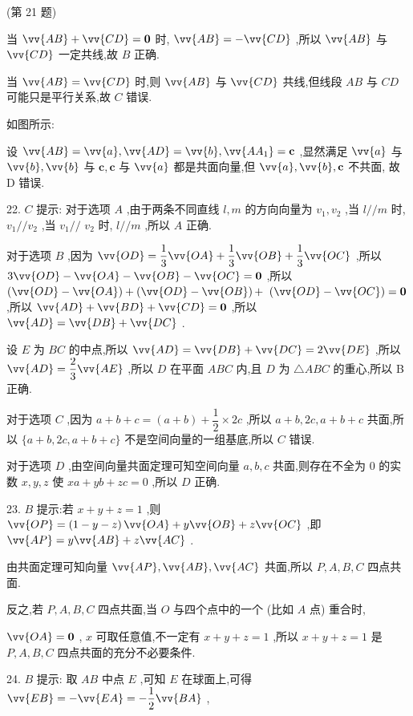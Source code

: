 (第 21 题)

当 $\vv{AB} + \vv{CD} = \mathbf{0}$ 时, $\vv{AB} =  - \vv{CD}$ ,所以 $\vv{AB}$ 与 $\vv{CD}$ 一定共线,故 $B$ 正确.

当 $\vv{AB} = \vv{CD}$ 时,则 $\vv{AB}$ 与 $\vv{CD}$ 共线,但线段 ${AB}$ 与 ${CD}$ 可能只是平行关系,故 $C$ 错误.

如图所示:

设 $\vv{AB} = \vv{a},\vv{AD} = \vv{b},\vv{A{A}_{1}} = \mathbf{c}$ ,显然满足 $\vv{a}$ 与 $\vv{b},\vv{b}$ 与 $\mathbf{c},\mathbf{c}$ 与 $\vv{a}$ 都是共面向量,但 $\vv{a},\vv{b},\mathbf{c}$ 不共面, 故 D 错误.

22. $C$ 提示: 对于选项 $A$ ,由于两条不同直线 $l,m$ 的方向向量为 ${v}_{1},{v}_{2}$ ,当 $l//m$ 时, ${v}_{1}//{v}_{2}$ ,当 ${v}_{1}//$  ${v}_{2}$ 时, $l//m$ ,所以 $A$ 正确.

对于选项 $B$ ,因为 $\vv{OD} = \dfrac{1}{3}\vv{OA} + \dfrac{1}{3}\vv{OB} + \dfrac{1}{3}\vv{OC}$ ,所以 $3\vv{OD} - \vv{OA} - \vv{OB} - \vv{OC} = \mathbf{0}$ ,所以 $\left( {\vv{OD} - \vv{OA}}\right)  + \left( {\vv{OD} - \vv{OB}}\right)  +$  $\left( {\vv{OD} - \vv{OC}}\right)  = \mathbf{0}$ ,所以 $\vv{AD} + \vv{BD} + \vv{CD} = \mathbf{0}$ ,所以 $\vv{AD} = \vv{DB} + \vv{DC}$ .

设 $E$ 为 ${BC}$ 的中点,所以 $\vv{AD} = \vv{DB} + \vv{DC} = 2\vv{DE}$ ,所以 $\vv{AD} = \dfrac{2}{3}\vv{AE}$ ,所以 $D$ 在平面 ${ABC}$ 内,且 $D$ 为 $\bigtriangleup  {ABC}$ 的重心,所以 B 正确.

对于选项 $C$ ,因为 $a + b + c = \left( {a + b}\right)  + \dfrac{1}{2} \times  {2c}$ ,所以 $a + b,{2c},a + b + c$ 共面,所以 $\{ a + b,{2c},a + b + c\}$ 不是空间向量的一组基底,所以 $C$ 错误.

对于选项 $D$ ,由空间向量共面定理可知空间向量 $a,b,c$ 共面,则存在不全为 0 的实数 $x,y,z$ 使 ${xa} + {yb} + {zc} = 0$ ,所以 $D$ 正确.

23. $B$ 提示:若 $x + y + z = 1$ ,则 $\vv{OP} = \left( {1 - y - z}\right) \vv{OA} + y\vv{OB} + z\vv{OC}$ ,即 $\vv{AP} = y\vv{AB} + z\vv{AC}$ .

由共面定理可知向量 $\vv{AP},\vv{AB},\vv{AC}$ 共面,所以 $P,A,B,C$ 四点共面.

反之,若 $P,A,B,C$ 四点共面,当 $O$ 与四个点中的一个 (比如 $A$ 点) 重合时,

$\vv{OA} = \mathbf{0}$ , $x$ 可取任意值,不一定有 $x + y + z = 1$ ,所以 $x + y + z = 1$ 是 $P,A,B,C$ 四点共面的充分不必要条件.

24. $B$ 提示: 取 ${AB}$ 中点 $E$ ,可知 $E$ 在球面上,可得 $\vv{EB} =  - \vv{EA} =  - \dfrac{1}{2}\vv{BA}$ ,

